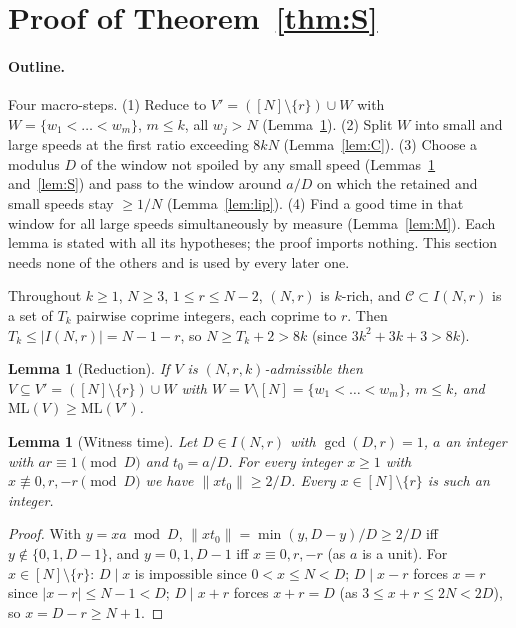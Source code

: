 \documentclass[11pt]{article}
\newtheorem{lemma}[theorem]{Lemma}
\theoremstyle{definition}
\theoremstyle{remark}
\newcommand{\nd}[1]{\lVert #1\rVert}
\newcommand{\ML}{\mathrm{ML}}
\begin{document}
\section{Proof of Theorem~\ref{thm:S}}\label{sec:proofS}

\paragraph{Outline.}
Four macro-steps. (1) Reduce to $V'=([N]\setminus\{r\})\cup W$ with $W=\{w_1<\dots<w_m\}$, $m\le k$, all $w_j>N$ (Lemma~\ref{lem:R}). (2) Split $W$ into small and large speeds at the first ratio exceeding $8kN$ (Lemma~\ref{lem:C}). (3) Choose a modulus $D$ of the window not spoiled by any small speed (Lemmas~\ref{lem:wit} and~\ref{lem:S}) and pass to the window around $a/D$ on which the retained and small speeds stay $\ge1/N$ (Lemma~\ref{lem:lip}). (4) Find a good time in that window for all large speeds simultaneously by measure (Lemma~\ref{lem:M}). Each lemma is stated with all its hypotheses; the proof imports nothing. This section needs none of the others and is used by every later one.

Throughout $k\ge1$, $N\ge3$, $1\le r\le N-2$, $(N,r)$ is $k$-rich, and $\mathcal C\subset I(N,r)$ is a set of $T_k$ pairwise coprime integers, each coprime to $r$. Then $T_k\le|I(N,r)|=N-1-r$, so $N\ge T_k+2>8k$ (since $3k^2+3k+3>8k$).

\begin{lemma}[Reduction]\label{lem:R}
If $V$ is $(N,r,k)$-admissible then $V\subseteq V'=([N]\setminus\{r\})\cup W$ with $W=V\setminus[N]=\{w_1<\dots<w_m\}$, $m\le k$, and $\ML(V)\ge\ML(V')$.
\end{lemma}

\begin{lemma}[Witness time]\label{lem:wit}
Let $D\in I(N,r)$ with $\gcd(D,r)=1$, $a$ an integer with $ar\equiv1\pmod D$ and $t_0=a/D$. For every integer $x\ge1$ with $x\not\equiv0,r,-r\pmod D$ we have $\nd{xt_0}\ge2/D$. Every $x\in[N]\setminus\{r\}$ is such an integer.
\end{lemma}
\begin{proof}
With $y=xa\bmod D$, $\nd{xt_0}=\min(y,D-y)/D\ge2/D$ iff $y\notin\{0,1,D-1\}$, and $y=0,1,D-1$ iff $x\equiv0,r,-r$ (as $a$ is a unit). For $x\in[N]\setminus\{r\}$: $D\mid x$ is impossible since $0<x\le N<D$; $D\mid x-r$ forces $x=r$ since $|x-r|\le N-1<D$; $D\mid x+r$ forces $x+r=D$ (as $3\le x+r\le2N<2D$), so $x=D-r\ge N+1$.
\end{proof}
\end{document}
